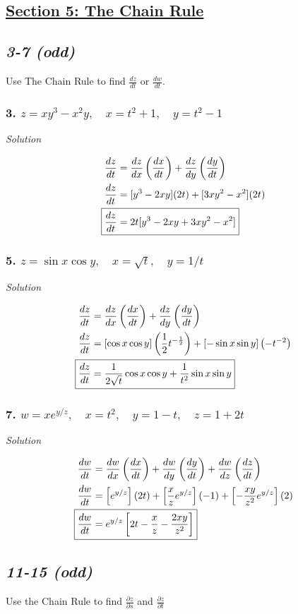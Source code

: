 \documentclass{article}
\title{
    \vspace{3in}
    \textmd{\textbf{\hmwkTitle}}\\
    \vspace{0.5in}
    \textmd{\textbf{\hmwkClass}}\\
    \vspace{4in}
}
\author{\hmwkAuthorName}
\date{}
\newcommand{\solution}{\centerline{\textit{Solution}}}
\newcommand{\pp}[2]{\displaystyle\frac{\partial #1}{\partial #2}}
\newcommand{\dd}[2]{\displaystyle\frac{d #1}{d #2}}
\newcommand{\bp}[1]{\left(#1\right)}
\newcommand{\bb}[1]{\left[#1\right]}
\begin{document}
\maketitle
\begin{center}
    \section*{\underline{Section 5: The Chain Rule}}
\end{center}
\begin{center}
\subsection*{\textit{3-7 (odd)}}
Use The Chain Rule to find $\dd z t$ or $\dd w t$. 
\end{center}
\subsubsection*{3. $z=xy^3-x^2y,\quad x=t^2+1,\quad y=t^2-1$}
\solution 
\begin{align*}
    \dd z t &= \dd z x \bp{\dd x t} + \dd z y \bp{\dd y t} \\
    \dd z t &= [y^3-2xy](2t) + [3xy^2-x^2](2t) \\
    \Aboxed{\dd z t &= 2t[y^3 - 2xy + 3xy^2 - x^2]}
\end{align*}
\subsubsection*{5. $z=\sin x \cos y,\quad x =\sqrt t, \quad y = 1/t$}
\solution
\begin{align*}
    \dd z t &= \dd z x \bp{\dd x t} + \dd z y \bp{\dd y t} \\
    \dd z t &= [\cos x \cos y]\bp{\frac 1 2 t^{-\frac 1 2}} + [-\sin x \sin y]
    \bp{-t^{-2}} \\
    \Aboxed{\dd z t &= \frac 1 {2\sqrt t} \cos x \cos y + \frac 1 {t^2}\sin x \sin y}
\end{align*}
\subsubsection*{7. $w = xe^{y/z},\quad x=t^2,\quad y=1-t,\quad z=1+2t$}
\solution
\begin{align*}
    \dd w t &= \dd w x \bp{\dd x t} + \dd w y \bp{\dd y t} + \dd w z \bp{\dd z t} \\
    \dd w t &= \bb{e^{y/z}}(2t) + \bb{\frac x z e^{y/z}}(-1) +
    \bb{-\frac {xy}{z^2}e^{y/z}}(2) \\
    \Aboxed{\dd w t &= e^{y/z}\bb{2t - \displaystyle\frac{x}{z} -
    \displaystyle\frac{2xy}{z^2}}}
\end{align*}
\newpage
\begin{center}
\subsection*{\textit{11-15 (odd)}}
Use the Chain Rule to find $\pp z s$ and $\pp z t$
\end{center}
\end{document}
